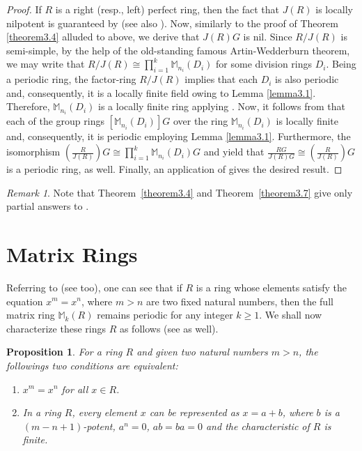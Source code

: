 \documentclass[12pt]{amsart}
\newtheorem{prop}[thm]{Proposition}
\theoremstyle{definition}
\theoremstyle{remark}
\newtheorem{rem}[thm]{Remark}
\numberwithin{equation}{section}
\begin{document}
\begin{proof}
If $R$ is a right (resp., left) perfect ring, then the fact that $J(R)$ is locally nilpotent is guaranteed by \cite[Proposition 23.15]{L} (see also \cite[Exercise 23.1]{L}). Now, similarly to the proof of Theorem \ref{theorem3.4} alluded to above, we derive that $J(R)G$ is nil. Since $R/J(R)$ is semi-simple, by the help of the old-standing famous Artin-Wedderburn theorem, we may write that $R/J(R) \cong \prod_{i=1}^k \mathbb{M}_{n_i}(D_i)$ for some division rings $D_i$. Being a periodic ring, the factor-ring $R/J(R)$ implies that each $D_i$ is also periodic and, consequently, it is a locally finite field owing to Lemma \ref{lemma3.1}. Therefore, $\mathbb{M}_{n_i}(D_i)$ is a locally finite ring applying \cite[Corollary 2.3]{HKL}. Now, it follows from \cite[Proposition 2.12]{HKL} that each of the group rings $[\mathbb{M}_{n_i}(D_i)]G$ over the ring $\mathbb{M}_{n_i}(D_i)$ is locally finite and, consequently, it is periodic employing Lemma \ref{lemma3.1}. Furthermore, the isomorphism $(\frac{R}{J(R)})G \cong \prod_{i=1}^k \mathbb{M}_{n_i}(D_i)G$ and \cite[Lemma 2.12]{BCL} yield that $\frac{RG}{J(R)G} \cong (\frac{R}{J(R)})G$ is a periodic ring, as well. Finally, an application of \cite[Corollary 3.6]{CD} gives the desired result.
\end{proof}

\begin{rem}
Note that Theorem~\ref{theorem3.4} and Theorem~\ref{theorem3.7} give only partial answers to \cite[Problem 1]{DanchevGroupRings}.
\end{rem}

\section{Matrix Rings}\label{SectionMatrixRings}

\medskip

Referring to \cite[Corollary 2.25]{BCL} (see \cite{CD} too), one can see that if $R$ is a ring whose elements satisfy the equation $x^m=x^n$, where $m> n$ are two fixed natural numbers, then the full matrix ring $\mathbb{M}_k(R)$ remains periodic for any integer $k\geq 1$. We shall now characterize these rings $R$ as follows (see \cite[Proposition 4]{D3} as well).

\begin{prop} \label{proposition2.2}
For a ring $R$ and given two natural numbers $m > n$, the followings two conditions are equivalent:
\begin{enumerate}
\item[\rm{(1)}] $x^m=x^n$ for all $x \in R$.

\item[\rm{(2)}] In a ring $R$, every element $x$ can be represented as $x=a+b$, where $b$ is a $(m-n+1)$-potent,  $a^n=0$, $ab=ba=0$ and the characteristic of $R$ is finite.
\end{enumerate}
\end{prop}
\end{document}
